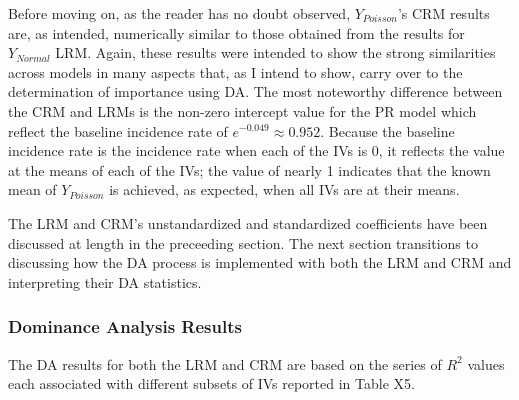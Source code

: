 \documentclass[ShortAfour,times,sageapa]{sagej}
\begin{document}
	Before moving on, as the reader has no doubt observed, $Y_{Poisson}$'s CRM results are, as intended, numerically similar to those obtained from the results for $Y_{Normal}$ LRM.
	Again, these results were intended to show the strong similarities across models in many aspects that, as I intend to show, carry over to the determination of importance using DA.
	The most noteworthy difference between the CRM and LRMs is the non-zero intercept value for the PR model which reflect the baseline incidence rate of $e^{-0.049} \approx 0.952$. 
	Because the baseline incidence rate is the incidence rate when each of the IVs is 0, it reflects the value at the means of each of the IVs; the value of nearly 1 indicates that the known mean of $Y_{Poisson}$ is achieved, as expected, when all IVs are at their means.	
	
	The LRM and CRM's unstandardized and standardized coefficients have been discussed at length in the preceeding section.
	The next section transitions to discussing how the DA process is implemented with both the LRM and CRM and interpreting their DA statistics.
	
		\subsubsection{Dominance Analysis Results}
		
	The DA results for both the LRM and CRM are based on the series of $R^2$ values each associated with different subsets of IVs reported in Table X5.
	
\end{document}
